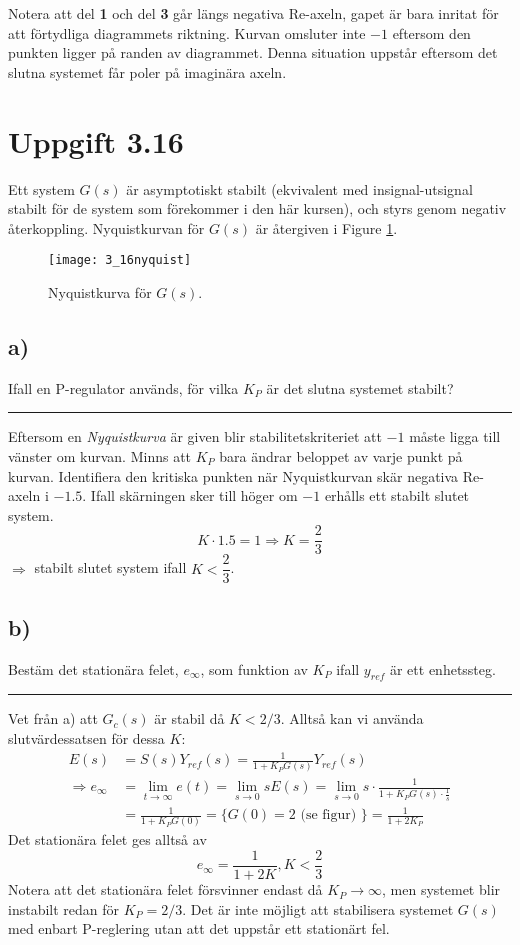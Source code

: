 \documentclass[12pt]{article}
\newcommand{\qline}{\hrule \vspace*{10pt}}
\begin{document}
Notera att del \textbf{1} och del \textbf{3} går längs negativa Re-axeln, gapet är bara inritat för att förtydliga diagrammets riktning. Kurvan omsluter inte $-1$ eftersom den punkten ligger på randen av diagrammet. Denna situation uppstår eftersom det slutna systemet får poler på imaginära axeln.

\section*{Uppgift 3.16}
Ett system $G(s)$ är asymptotiskt stabilt (ekvivalent med insignal-utsignal stabilt för de system som förekommer i den här kursen), och styrs genom negativ återkoppling. Nyquistkurvan för $G(s)$ är återgiven i Figure \ref{fig:316nyquist}.

\begin{figure}[h!]
  \centering
  \texttt{[image: 3\_16nyquist]}
  \caption{Nyquistkurva för $G(s)$.}
  \label{fig:316nyquist}
\end{figure}

\subsection*{a)}
Ifall en P-regulator används, för vilka $K_P$ är det slutna systemet stabilt?
\qline
Eftersom en \emph{Nyquistkurva} är given blir stabilitetskriteriet att $-1$ måste ligga till vänster om kurvan. Minns att $K_P$ bara ändrar beloppet av varje punkt på kurvan. Identifiera den kritiska punkten när Nyquistkurvan skär negativa Re-axeln i $-1.5$. Ifall skärningen sker till höger om $-1$ erhålls ett stabilt slutet system.
\[K\cdot 1.5 = 1 \Rightarrow K = \frac{2}{3}\]
$\Rightarrow$ stabilt slutet system ifall $K < \dfrac{2}{3}$.

\subsection*{b)}
Bestäm det stationära felet, $e_{\infty}$, som funktion av $K_P$ ifall $y_{ref}$ är ett enhetssteg.
\qline
Vet från a) att $G_c(s)$ är stabil då $K < 2/3$. Alltså kan vi använda slutvärdessatsen för dessa $K$:
\begin{align*}
  E(s) &= S(s)Y_{ref}(s) = \frac{1}{1+K_PG(s)}Y_{ref}(s) \\
  \Rightarrow e_{\infty} &= \lim_{t \to \infty}e(t) = \lim_{s \to 0}sE(s) = \lim_{s \to 0}s \cdot \frac{1}{1 + K_PG(s)\cdot\frac{1}{s}} \\
  &= \frac{1}{1+K_PG(0)} = \lbrace G(0) = 2 \text{ (se figur) } \rbrace = \frac{1}{1+2K_P}
\end{align*}
Det stationära felet ges alltså av
\[e_{\infty} = \frac{1}{1+2K}, K < \frac{2}{3}\]
Notera att det stationära felet försvinner endast då $K_P \to \infty$, men systemet blir instabilt redan för $K_P = 2/3$. Det är inte möjligt att stabilisera systemet $G(s)$ med enbart P-reglering utan att det uppstår ett stationärt fel.
\end{document}
